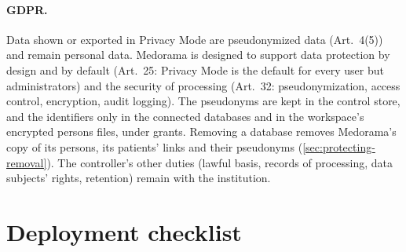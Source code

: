 \paragraph{GDPR.} Data shown or exported in Privacy Mode are pseudonymized data (Art.~4(5)) and
remain personal data. Medorama is designed to support data protection by design and by default
(Art.~25: Privacy Mode is the default for every user but administrators) and the security of
processing (Art.~32: pseudonymization, access control, encryption, audit logging). The pseudonyms are kept
in the control store, and the identifiers only in the connected databases and in the workspace's
encrypted persons files, under grants. Removing a database removes Medorama's copy of its
persons, its patients' links and their pseudonyms (\cref{sec:protecting-removal}). The controller's other duties (lawful basis, records of processing,
data subjects' rights, retention) remain with the institution.

\section{Deployment checklist}
\label{sec:security-checklist}

